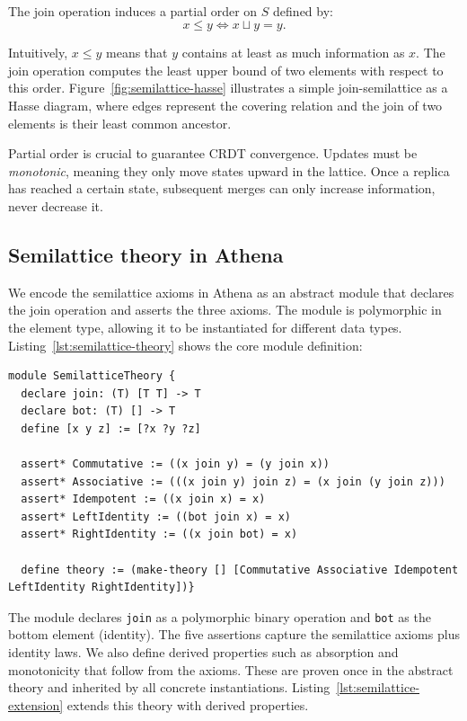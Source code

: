 \\The join operation induces a partial order on $S$ defined by:
\[
  x \leq y \iff x \sqcup y = y.
\]

Intuitively, $x \leq y$ means that $y$ contains at least as much information as $x$. The join operation computes the least upper bound of two elements with respect to this order. Figure~\ref{fig:semilattice-hasse} illustrates a simple join-semilattice as a Hasse diagram, where edges represent the covering relation and the join of two elements is their least common ancestor.

Partial order is crucial to guarantee CRDT convergence. Updates must be \emph{monotonic}, meaning they only move states upward in the lattice. Once a replica has reached a certain state, subsequent merges can only increase information, never decrease it.

\subsection*{Semilattice theory in Athena}

We encode the semilattice axioms in Athena as an abstract module that declares the join operation and asserts the three axioms. The module is polymorphic in the element type, allowing it to be instantiated for different data types. Listing~\ref{lst:semilattice-theory} shows the core module definition:\\

\begin{lstlisting}[language=Athena,style=athena,label={lst:semilattice-theory},caption={SemilatticeTheory: Abstract semilattice axioms}]
module SemilatticeTheory {
  declare join: (T) [T T] -> T
  declare bot: (T) [] -> T
  define [x y z] := [?x ?y ?z]

  assert* Commutative := ((x join y) = (y join x))
  assert* Associative := (((x join y) join z) = (x join (y join z)))
  assert* Idempotent := ((x join x) = x)
  assert* LeftIdentity := ((bot join x) = x)
  assert* RightIdentity := ((x join bot) = x)

  define theory := (make-theory [] [Commutative Associative Idempotent LeftIdentity RightIdentity])}
\end{lstlisting}

The module declares \lstinline{join} as a polymorphic binary operation and \lstinline{bot} as the bottom element (identity). The five assertions capture the semilattice axioms plus identity laws. We also define derived properties such as absorption and monotonicity that follow from the axioms. These are proven once in the abstract theory and inherited by all concrete instantiations. Listing~\ref{lst:semilattice-extension} extends this theory with derived properties.\\\

